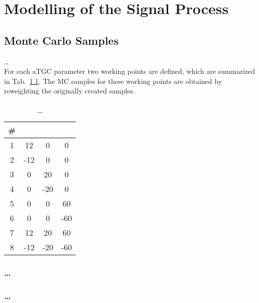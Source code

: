 \chapter{Modelling of the Signal Process}
\label{chap:signal}

\section{Monte Carlo Samples}
\dots \\
For each aTGC parameter two working points are defined, which are summarized in Tab.~\ref{tab:signal:aTGCpoints}. The MC samples for these working points are obtained by reweighting the originally created samples.
\begin{table}
	\centering
	\caption{\dots}
	\label{tab:signal:aTGCpoints}
	\begin{tabular}{cccc}
	\hline
	\# & \cwww & \ccw & \cb \\
	\hline
	1 &  12 & 0 & 0\\
	2 & -12 & 0 & 0\\
	3 & 0 &  20 & 0\\
	4 & 0 & -20 & 0\\
	5 & 0 & 0 &  60\\
	6 & 0 & 0 & -60\\
	7 &	12 & 20 & 60\\
	8 & -12 & -20 & -60\\
	\hline
	\end{tabular}
\end{table} 
\subsection{\dots}
\subsection{\dots}
